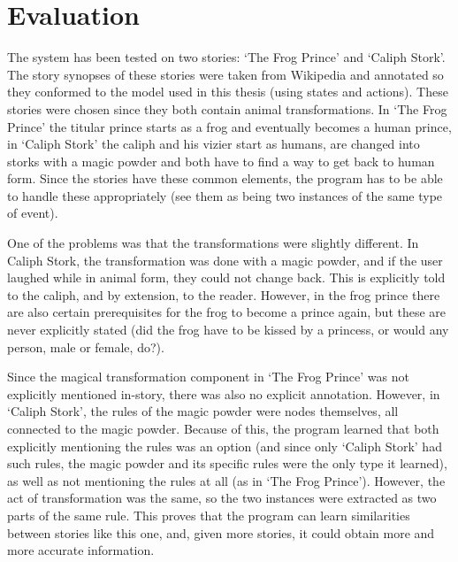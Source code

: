 \section{Evaluation}

The system has been tested on two stories: `The Frog Prince' and
`Caliph Stork'. The story synopses of these stories were taken from Wikipedia
and annotated so they conformed to the model used in this thesis (using states
and actions).
These stories were chosen since they both contain animal transformations. In `The
Frog Prince' the titular prince starts as a frog and eventually becomes a human
prince, in `Caliph Stork' the caliph and his vizier start as humans, are changed
into storks with a magic powder and both have to find a way to get back to human
form. Since the stories have these common elements, the program has to be able to
handle these appropriately (see them as being two instances of the same type of
event).

One of the problems was that the transformations were slightly different. In
Caliph Stork, the transformation was done with a magic powder, and if the user
laughed while in animal form, they could not change back. This is explicitly
told to the caliph, and by extension, to the reader. However, in the frog prince
there are also certain prerequisites for the frog to become a prince again, but
these are never explicitly stated (did the frog have to be kissed by a princess,
or would any person, male or female, do?).

Since the magical transformation component in `The Frog Prince' was not explicitly
mentioned in-story, there was also no explicit annotation. However, in `Caliph
Stork', the rules of the magic powder were nodes themselves, all connected to
the magic powder. Because of this, the program learned that both explicitly
mentioning the rules was an option (and since only `Caliph Stork' had such
rules, the magic powder and its specific rules were the only type it learned), as well as not mentioning the rules
at all (as in `The Frog Prince'). However, the act of transformation was the
same, so the two instances were extracted as two parts of the same rule. This proves that the
program can learn similarities between stories like this one, and, given more
stories, it could obtain more and more accurate information.

